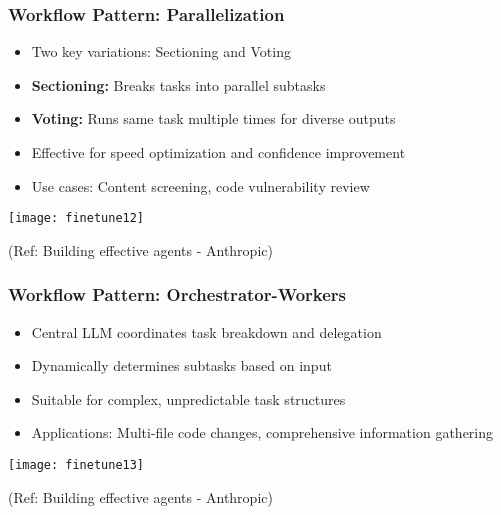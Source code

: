 \begin{frame}[fragile]\frametitle{Workflow Pattern: Parallelization}
\begin{itemize}
    \item Two key variations: Sectioning and Voting
    \item \textbf{Sectioning:} Breaks tasks into parallel subtasks
    \item \textbf{Voting:} Runs same task multiple times for diverse outputs
    \item Effective for speed optimization and confidence improvement
    \item Use cases: Content screening, code vulnerability review
\end{itemize}

\begin{center}
\texttt{[image: finetune12]}
\end{center}

{\tiny (Ref: Building effective agents - Anthropic)}
\end{frame}

\begin{frame}[fragile]\frametitle{Workflow Pattern: Orchestrator-Workers}
\begin{itemize}
    \item Central LLM coordinates task breakdown and delegation
    \item Dynamically determines subtasks based on input
    \item Suitable for complex, unpredictable task structures
    \item Applications: Multi-file code changes, comprehensive information gathering
\end{itemize}

\begin{center}
\texttt{[image: finetune13]}
\end{center}

{\tiny (Ref: Building effective agents - Anthropic)}
\end{frame}

